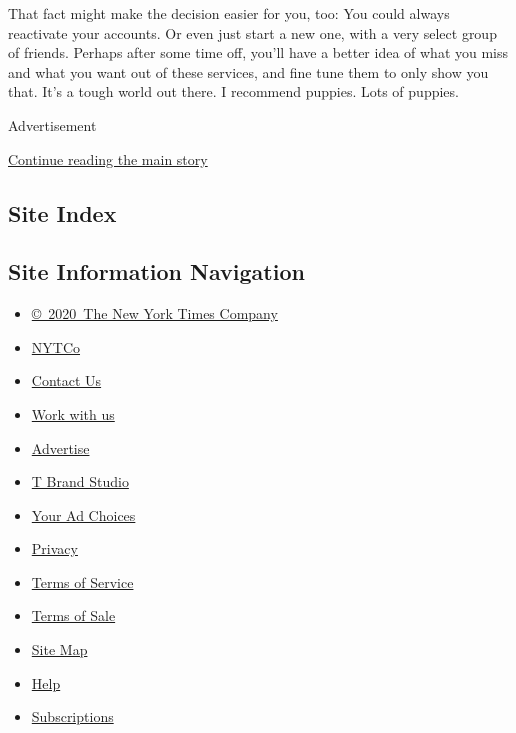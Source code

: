 That fact might make the decision easier for you, too: You could always
reactivate your accounts. Or even just start a new one, with a very
select group of friends. Perhaps after some time off, you'll have a
better idea of what you miss and what you want out of these services,
and fine tune them to only show you that. It's a tough world out there.
I recommend puppies. Lots of puppies.

Advertisement

\protect\hyperlink{after-bottom}{Continue reading the main story}

\hypertarget{site-index}{%
\subsection{Site Index}\label{site-index}}

\hypertarget{site-information-navigation}{%
\subsection{Site Information
Navigation}\label{site-information-navigation}}

\begin{itemize}
\tightlist
\item
  \href{https://help.nytimes3xbfgragh.onion/hc/en-us/articles/115014792127-Copyright-notice}{©~2020~The
  New York Times Company}
\end{itemize}

\begin{itemize}
\tightlist
\item
  \href{https://www.nytco.com/}{NYTCo}
\item
  \href{https://help.nytimes3xbfgragh.onion/hc/en-us/articles/115015385887-Contact-Us}{Contact
  Us}
\item
  \href{https://www.nytco.com/careers/}{Work with us}
\item
  \href{https://nytmediakit.com/}{Advertise}
\item
  \href{http://www.tbrandstudio.com/}{T Brand Studio}
\item
  \href{https://www.nytimes3xbfgragh.onion/privacy/cookie-policy\#how-do-i-manage-trackers}{Your
  Ad Choices}
\item
  \href{https://www.nytimes3xbfgragh.onion/privacy}{Privacy}
\item
  \href{https://help.nytimes3xbfgragh.onion/hc/en-us/articles/115014893428-Terms-of-service}{Terms
  of Service}
\item
  \href{https://help.nytimes3xbfgragh.onion/hc/en-us/articles/115014893968-Terms-of-sale}{Terms
  of Sale}
\item
  \href{https://spiderbites.nytimes3xbfgragh.onion}{Site Map}
\item
  \href{https://help.nytimes3xbfgragh.onion/hc/en-us}{Help}
\item
  \href{https://www.nytimes3xbfgragh.onion/subscription?campaignId=37WXW}{Subscriptions}
\end{itemize}
